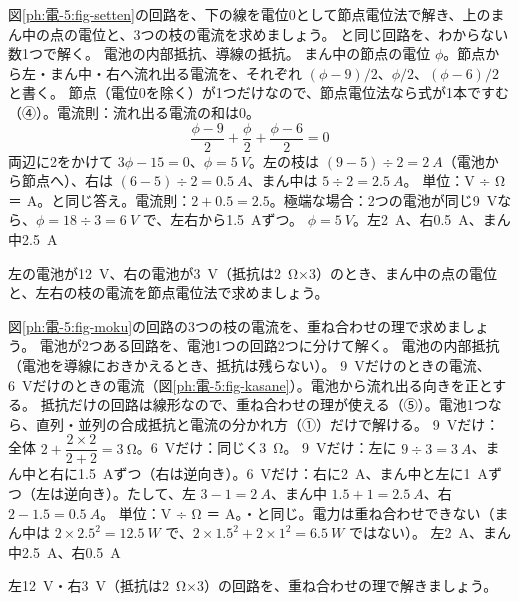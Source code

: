 \begin{phreidai}
\label{ph:電-5:ex6}図\ref{ph:電-5:fig-setten}の回路を、下の線を電位0として節点電位法で解き、上のまん中の点の電位と、3つの枝の電流を求めましょう。
\phbamen
{}と同じ回路を、わからない数1つで解く。
\phmushi
電池の内部抵抗、導線の抵抗。
\phzu
まん中の節点の電位 $\phi$。節点から左・まん中・右へ流れ出る電流を、それぞれ $(\phi-9)/2$、$\phi/2$、$(\phi-6)/2$ と書く。
\phriyu
節点（電位0を除く）が1つだけなので、節点電位法なら式が1本ですむ（④）。電流則：流れ出る電流の和は0。
\phtateru
\[ \frac{\phi-9}{2}+\frac{\phi}{2}+\frac{\phi-6}{2}=0 \]
\phtoku
両辺に2をかけて $3\phi-15=0$、$\phi=\qty{5}{V}$。左の枝は $(9-5)\div2=\qty{2}{A}$（電池から節点へ）、右は $(6-5)\div2=\qty{0.5}{A}$、まん中は $5\div2=\qty{2.5}{A}$。
\phtashikame
単位：V ÷ Ω ＝ A。と同じ答え。電流則：$2+0.5=2.5$。極端な場合：2つの電池が同じ\qty{9}{V}なら、$\phi=18\div3=\qty{6}{V}$ で、左右から\qty{1.5}{A}ずつ。
\kotae $\phi=\qty{5}{V}$。左\qty{2}{A}、右\qty{0.5}{A}、まん中\qty{2.5}{A}
\end{phreidai}
\begin{jibun}
左の電池が\qty{12}{V}、右の電池が\qty{3}{V}（抵抗は\qty{2}{\ohm}×3）のとき、まん中の点の電位と、左右の枝の電流を節点電位法で求めましょう。
\end{jibun}

\begin{phreidai}[重ね合わせの理で解く]
\label{ph:電-5:ex7}図\ref{ph:電-5:fig-moku}の回路の3つの枝の電流を、重ね合わせの理で求めましょう。
\phbamen
電池が2つある回路を、電池1つの回路2つに分けて解く。
\phmushi
電池の内部抵抗（電池を導線におきかえるとき、抵抗は残らない）。
\phzu
\qty{9}{V}だけのときの電流、\qty{6}{V}だけのときの電流（図\ref{ph:電-5:fig-kasane}）。電池から流れ出る向きを正とする。
\phriyu
抵抗だけの回路は線形なので、重ね合わせの理が使える（⑤）。電池1つなら、直列・並列の合成抵抗と電流の分かれ方（①）だけで解ける。
\phtateru
\qty{9}{V}だけ：全体 $2+\dfrac{2\times2}{2+2}=\qty{3}{\ohm}$。\qty{6}{V}だけ：同じく\qty{3}{\ohm}。
\phtoku
\qty{9}{V}だけ：左に $9\div3=\qty{3}{A}$、まん中と右に\qty{1.5}{A}ずつ（右は逆向き）。\qty{6}{V}だけ：右に\qty{2}{A}、まん中と左に\qty{1}{A}ずつ（左は逆向き）。たして、左 $3-1=\qty{2}{A}$、まん中 $1.5+1=\qty{2.5}{A}$、右 $2-1.5=\qty{0.5}{A}$。
\phtashikame
単位：V ÷ Ω ＝ A。・と同じ。電力は重ね合わせできない（まん中は $2\times2.5^2=\qty{12.5}{W}$ で、$2\times1.5^2+2\times1^2=\qty{6.5}{W}$ ではない）。
\kotae 左\qty{2}{A}、まん中\qty{2.5}{A}、右\qty{0.5}{A}
\end{phreidai}
\begin{jibun}
左\qty{12}{V}・右\qty{3}{V}（抵抗は\qty{2}{\ohm}×3）の回路を、重ね合わせの理で解きましょう。
\end{jibun}

